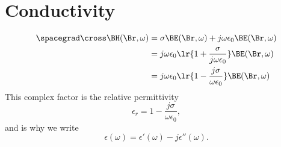 \section{Conductivity}
%
%
\begin{equation}\label{eqn:druid:260}
\begin{aligned}
\spacegrad \cross \BH(\Br, \omega)
&= \sigma \BE(\Br, \omega) + j \omega \epsilon_0 \BE(\Br, \omega)
\\ &= j \omega \epsilon_0 \lr{ 1 + \frac{\sigma}{j \omega \epsilon_0} } \BE(\Br, \omega)
\\ &= j \omega \epsilon_0 \lr{ 1 - \frac{j \sigma}{\omega \epsilon_0} } \BE(\Br, \omega)
\end{aligned}
\end{equation}
%
This complex factor is the relative permittivity
%
\begin{equation}\label{eqn:druid:280}
\epsilon_r
= 1 - \frac{j \sigma}{\omega \epsilon_0},
\end{equation}
%
and is why we write
%
\begin{equation}\label{eqn:druid:300}
\epsilon(\omega) = \epsilon'(\omega) - j \epsilon''(\omega).
\end{equation}
%
